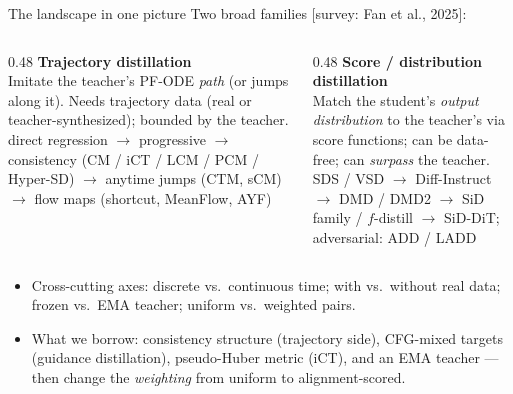 \documentclass[aspectratio=169,10pt]{beamer}
\newcommand{\litref}[1]{{\scriptsize\color{black!55}[#1]}}
\begin{document}
\begin{frame}{The landscape in one picture}
  Two broad families \litref{survey: Fan et al., 2025}:
  \vspace{0.2em}
  \begin{columns}[T]
    \begin{column}{0.48\textwidth}
      \textbf{Trajectory distillation}\\[2pt]
      {\small Imitate the teacher's PF-ODE \emph{path} (or jumps along it).
      Needs trajectory data (real or teacher-synthesized); bounded by the
      teacher.}\\[3pt]
      {\footnotesize direct regression $\to$ progressive $\to$ consistency
      (CM / iCT / LCM / PCM / Hyper-SD) $\to$ anytime jumps (CTM, sCM) $\to$
      flow maps (shortcut, MeanFlow, AYF)}
    \end{column}
    \begin{column}{0.48\textwidth}
      \textbf{Score / distribution distillation}\\[2pt]
      {\small Match the student's \emph{output distribution} to the teacher's
      via score functions; can be data-free; can \emph{surpass} the
      teacher.}\\[3pt]
      {\footnotesize SDS / VSD $\to$ Diff-Instruct $\to$ DMD / DMD2 $\to$
      SiD family / $f$-distill $\to$ SiD-DiT; adversarial: ADD / LADD}
    \end{column}
  \end{columns}
  \vspace{0.7em}
  \begin{itemize}
    \item Cross-cutting axes: discrete vs.\ continuous time; with vs.\ without
      real data; frozen vs.\ EMA teacher; uniform vs.\ weighted pairs.
    \item \alert{What we borrow}: consistency structure (trajectory side),
      CFG-mixed targets (guidance distillation), pseudo-Huber metric (iCT),
      and an EMA teacher --- then change the \emph{weighting} from uniform
      to alignment-scored.
  \end{itemize}
\end{frame}
\end{document}
